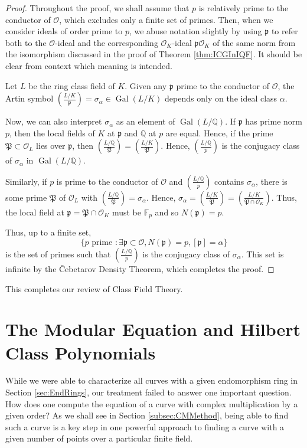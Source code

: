 \documentclass{amsart}
\theoremstyle{definition}
\theoremstyle{remark}
\numberwithin{equation}{section}
\newcommand{\cO}{\mathcal O}
\newcommand{\fkp}{\mathfrak p}
\newcommand{\fkP}{\mathfrak{P}}
\newcommand{\bbF}{\mathbb F}
\newcommand{\bbQ}{\mathbb Q}
\newcommand{\artin}[2]{\left( \frac{#1}{#2}\right)}
\DeclareMathOperator{\Gal}{Gal}
\begin{document}
\begin{proof}
Throughout the proof, we shall assume that $p$ is relatively prime to the conductor of $\cO$, which excludes only a finite set of primes. Then, when we consider ideals of order prime to $p$, we abuse notation slightly by using $\fkp$ to refer both to the $\cO$-ideal and the corresponding $\cO_{K}$-ideal $\fkp \cO_{K}$ of the same norm from the isomorphism discussed in the proof of Theorem \ref{thm:ICGInIQF}. It should be clear from context which meaning is intended. 

Let $L$ be the ring class field of $K$. Given any $\fkp$ prime to the conductor of $\cO$, the Artin symbol $\artin{L/K}{\fkp} = \sigma_{\alpha} \in \Gal(L/K)$ depends only on the ideal class $\alpha$. 

Now, we can also interpret $\sigma_{\alpha}$ as an element of $\Gal(L/\bbQ)$. If $\fkp$ has prime norm $p$, then the local fields of $K$ at $\fkp$ and $\bbQ$ at $p$ are equal. Hence, if the prime $\fkP \subset \cO_{L}$ lies over $\fkp$, then $\artin{L/\bbQ}{\fkP} =  \artin{L/K}{\fkP}.$ Hence, $\artin{L/\bbQ}{p}$ is the conjugacy class of $\sigma_{\alpha}$ in $\Gal(L/\bbQ)$.

Similarly, if $p$ is prime to the conductor of $\cO$ and $\artin{L/\bbQ}{p}$ contains $\sigma_{\alpha}$, there is some prime $\fkP$ of $\cO_{L}$ with $\artin{L/\bbQ}{\fkP} = \sigma_{\alpha}$. Hence, $\sigma_{\alpha} = \artin{L/K}{\fkP} = \artin{L/K}{\fkP \cap \cO_{K}}$. Thus, the local field at $\fkp = \fkP \cap \cO_{K}$ must be $\bbF_{p}$ and so $N(\fkp) = p$. 

Thus, up to a finite set, 
\[
\{ p \text{ prime } : \exists \fkp \subset \cO, N(\fkp) = p, [\fkp] = \alpha\}
\]
is the set of primes such that $\artin{L/\bbQ}{p}$ is the conjugacy class of $\sigma_{\alpha}$. This set is infinite by the \v{C}ebetarov Density Theorem, which completes the proof.
\end{proof}

This completes our review of Class Field Theory. 

\section{
The Modular Equation and Hilbert Class Polynomials} \label{sec:CMStuff}

 While we were able to characterize all curves with a given endomorphism ring in Section \ref{sec:EndRings}, our treatment failed to answer one important question. How does one compute the equation of a curve with complex multiplication by a given order? As we shall see in Section 
 \ref{subsec:CMMethod},
 being able to find such a curve is a key step in one powerful approach to finding a curve with a given number of points over a particular finite field. 
 
\end{document}
